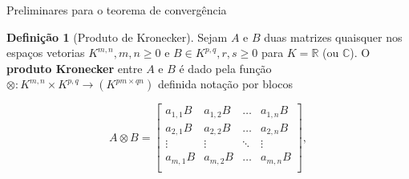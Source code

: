 \documentclass{beamer}
\newcommand{\R}{\mathbb{R}}
\newcommand{\C}{\mathbb{C}}
\theoremstyle{plain}
\theoremstyle{definition}
\newtheorem{defi}{Definição}
\begin{document}

\begin{frame}{Preliminares para o teorema de convergência}

    \small
    \begin{defi}[Produto de Kronecker]
        \label{apendices:def:kronecker_product}
        Sejam $A$ e $B$ duas matrizes quaisquer nos espaços vetorias $K^{m, n}, m,n \geq 0$ e $B \in K^{p, q}, r,s \geq 0$ 
        para $K = \R$ (ou $\C$). O \textbf{produto Kronecker} entre $A$ e $B$ é dado pela função
        $\otimes: K^{m, n} \times K^{p, q} \to (K^{pm \times qn})$ definida notação por blocos

        \[
            A \otimes B = 
            \begin{bmatrix}
                a_{1,1} B & a_{1,2} B & \dots & a_{1, n} B \\
                a_{2,1} B & a_{2,2} B & \dots & a_{2, n} B \\
                \vdots & \vdots & \ddots & \vdots \\
                a_{m,1} B & a_{m,2} B & \dots & a_{m, n} B \\
            \end{bmatrix},
        \]


    \end{defi}

     
\end{frame}


\end{document}
